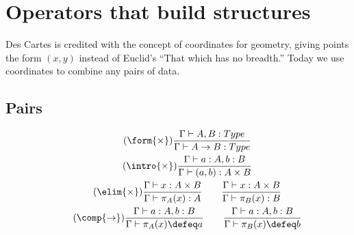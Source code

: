 \section{Operators that build structures}
Des Cartes is credited with the concept of coordinates 
for geometry, giving points the form $(x,y)$ instead of 
Euclid's ``That which has no breadth.''  Today we use 
coordinates to combine any pairs of data.

\subsection{Pairs}
\begin{gather}
    \tag{$\form{\times}$}
    \frac{\Gamma\vdash A,B:Type}{\Gamma\vdash A\to B:Type}\\
    \tag{$\intro{\times}$}
    \frac{
        \Gamma\vdash a:A, b:B
    }{
        \Gamma \vdash (a,b):A\times B
    }\\
    \tag{$\elim{\times}$}
    \frac{
        \Gamma\vdash x:A\times B
    }{
        \Gamma \vdash \pi_A(x):A
    }
    \qquad
    \frac{
        \Gamma\vdash x:A\times B
    }{
        \Gamma \vdash \pi_B(x):B
    }\\
    \tag{$\comp{\to}$}
    \frac{
        \Gamma\vdash a:A, b:B
    }{
        \Gamma \vdash \pi_A(x)\defeq a
    }
    \qquad
    \frac{
        \Gamma\vdash a:A, b:B
    }{
        \Gamma \vdash \pi_B(x)\defeq b
    }
\end{gather}
